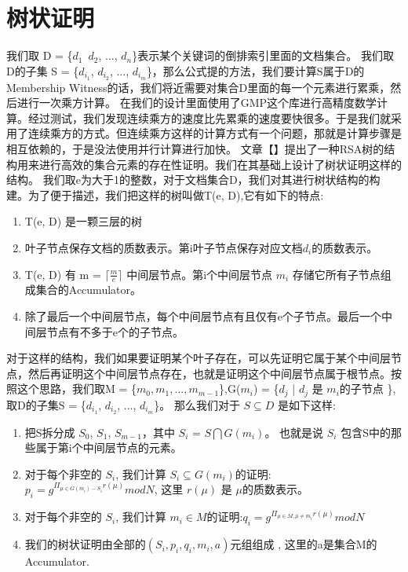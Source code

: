 \section{树状证明}

我们取 D = \{$d_1$\, $d_2$, ..., $d_n$\}表示某个关键词的倒排索引里面的文档集合。
我们取D的子集 S = \{$d_{i_1}$, $d_{i_2}$, ..., $d_{i_m}$\}，那么公式提的方法，我们要计算S属于D的Membership Witness的话，我们将近需要对集合D里面的每一个元素进行累乘，然后进行一次乘方计算。
在我们的设计里面使用了GMP这个库进行高精度数学计算。经过测试，我们发现连续乘方的速度比先累乘的速度要快很多。于是我们就采用了连续乘方的方式。但连续乘方这样的计算方式有一个问题，那就是计算步骤是相互依赖的，于是没法使用并行计算进行加快。
文章【】提出了一种RSA树的结构用来进行高效的集合元素的存在性证明。我们在其基础上设计了树状证明这样的结构。
我们取e为大于1的整数，对于文档集合D，我们对其进行树状结构的构建。为了便于描述，我们把这样的树叫做T(e, D),它有如下的特点:
\begin{enumerate}
  \item T(e, D) 是一颗三层的树
  \item 叶子节点保存文档的质数表示。第i叶子节点保存对应文档$d_i$的质数表示。
  \item T(e, D) 有 m = $\lceil \frac{m}{e} \rceil$ 中间层节点。第i个中间层节点 $m_i$ 存储它所有子节点组成集合的Accumulator。
  \item 除了最后一个中间层节点，每个中间层节点有且仅有e个子节点。最后一个中间层节点有不多于e个的子节点。
\end{enumerate}

对于这样的结构，我们如果要证明某个叶子存在，可以先证明它属于某个中间层节点，然后再证明这个中间层节点存在，也就是证明这个中间层节点属于根节点。按照这个思路，我们取M = \{$m_0, m_1, ..., m_{m-1}$\},G($m_i$) = \{$d_j$ | $d_j$ 是 $m_i$的子节点 \}, 取D的子集S = \{$d_{i_1}$, $d_{i_2}$, ..., $d_{i_m}$\}。 那么我们对于 $S \subseteq D$ 是如下这样:
\begin{enumerate}
  \item 把S拆分成 $S_0$, $S_1$, $S_{m-1}$，其中 $S_i$ = $S \bigcap G(m_i)$。 也就是说 $S_i$ 包含S中的那些属于第i个中间层节点的元素。
  \item 对于每个非空的 $S_i$, 我们计算 $S_i \subseteq G(m_i)$的证明: $p_i = g^{\Pi_{\mu \in G(m_i) - S_i} r(\mu)} mod N$, 这里 $r(\mu)$ 是 $\mu$的质数表示。 
  \item 对于每个非空的 $S_i$, 我们计算 $m_i \in M$的证明:$q_i =  g^{\Pi_{\mu \in M, \mu \ne m_i} r(\mu)} mod N$
  \item 我们的树状证明由全部的$(S_i, p_i, q_i, m_i, a)$元组组成 , 这里的a是集合M的Accumulator.
\end{enumerate}

